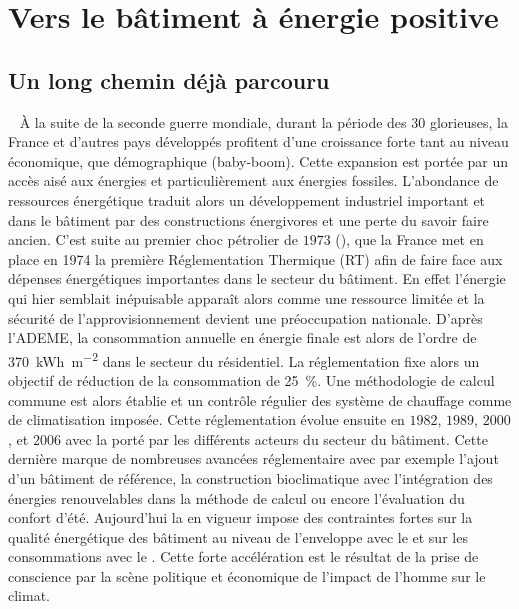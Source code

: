 \section{Vers le bâtiment à énergie positive} %
\label{sec:vers_le_batiment_a_energie_positive}
\subsection{Un long chemin déjà parcouru} %
\label{sub:un_long_chemin_deja_parcouru}
~
À la suite de la seconde guerre mondiale, durant la période des 30 glorieuses, la France
et d’autres pays développés profitent d’une croissance forte tant au niveau économique,
que démographique (baby-boom). Cette expansion est portée par un accès aisé aux énergies
et particulièrement aux énergies fossiles. L’abondance de ressources énergétique traduit
alors un développement industriel important et dans le bâtiment par des
constructions énergivores et une perte du savoir faire ancien. C’est suite au premier choc
pétrolier de $1973$ (), que la France met en place en 1974 la première
Réglementation Thermique (RT) afin de faire face aux dépenses énergétiques importantes
dans le secteur du bâtiment. En effet l’énergie qui hier semblait inépuisable apparaît
alors comme une ressource limitée et la sécurité de l’approvisionnement devient une
préoccupation nationale. D’après l’ADEME, la consommation annuelle en énergie finale est
alors de l’ordre de \SI{370}{kWh\per\metre\squared} dans le secteur du résidentiel. La
réglementation fixe alors un objectif de réduction de la consommation de
\SI{25}{\percent}. Une méthodologie de calcul commune est alors établie et
un contrôle régulier des système de chauffage comme de climatisation imposée.
Cette réglementation évolue ensuite en $1982$, $1989$, $2000$, et $2006$ avec la  porté par
les différents acteurs du secteur du bâtiment. Cette dernière marque de nombreuses avancées
réglementaire avec par exemple l’ajout d’un bâtiment de référence, la construction bioclimatique
avec l’intégration des énergies renouvelables dans la méthode de calcul ou encore l’évaluation
du confort d’été.
Aujourd’hui la  en vigueur impose
des contraintes fortes sur la qualité énergétique des bâtiment au niveau de l’enveloppe
avec le  et sur les consommations avec le . Cette forte accélération
est le résultat de la prise de conscience par la scène politique et économique de l’impact de
l’homme sur le climat.

